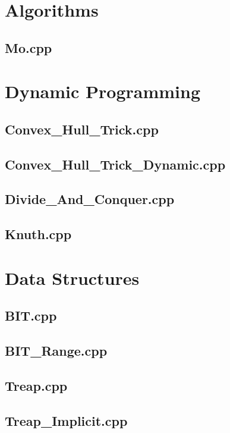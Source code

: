 \section{Algorithms}
\subsection{Mo.cpp}

\section{Dynamic Programming}
\subsection{Convex\_Hull\_Trick.cpp}

\subsection{Convex\_Hull\_Trick\_Dynamic.cpp}

\subsection{Divide\_And\_Conquer.cpp}

\subsection{Knuth.cpp}

\section{Data Structures}
\subsection{BIT.cpp}

\subsection{BIT\_Range.cpp}

\subsection{Treap.cpp}

\subsection{Treap\_Implicit.cpp}

